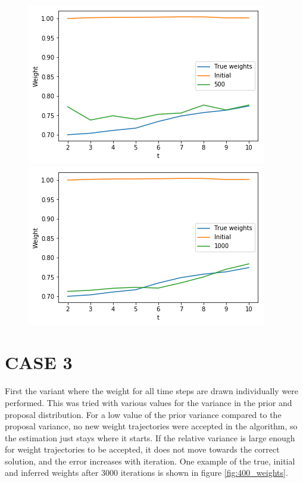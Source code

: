 \begin{figure}[H]
    \includegraphics[scale = 0.4]{fig/10000_500.png}
    \includegraphics[scale = 0.4]{fig/10000_1000.png}
\end{figure}






\section{CASE 3}
\label{sec:CASE3_r}
First the variant where the weight for all time steps are drawn individually were performed. This was tried with various values for the variance in the prior and proposal distribution. For a low value of the prior variance compared to the proposal variance, no new weight trajectories were accepted in the algorithm, so the estimation just stays where it starts. If the relative variance is large enough for weight trajectories to be accepted, it does not move towards the correct solution, and the error increases with iteration. One example of the true, initial and inferred weights after 3000 iterations is shown in figure \ref{fig:400_weights}. 


